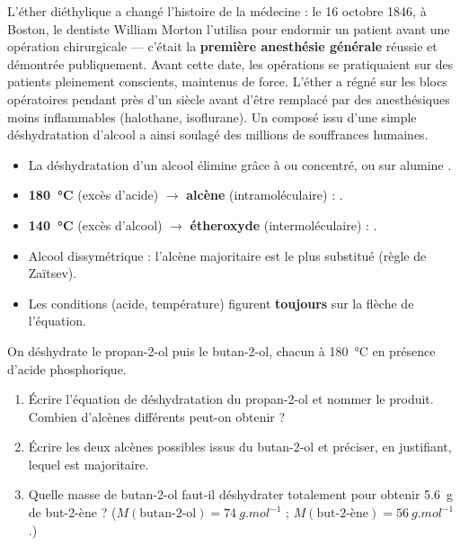 \documentclass[11pt]{article}
\newcommand{\cle}[1]{{\popxbold\color{popdark}#1}}
\begin{document}
\begin{savaistu}
L'éther diéthylique a changé l'histoire de la médecine : le 16 octobre 1846, à Boston, le dentiste William Morton l'utilisa pour endormir un patient avant une opération chirurgicale — c'était la \textbf{première anesthésie générale} réussie et démontrée publiquement. Avant cette date, les opérations se pratiquaient sur des patients pleinement conscients, maintenus de force. L'éther a régné sur les blocs opératoires pendant près d'un siècle avant d'être remplacé par des anesthésiques moins inflammables (halothane, isoflurane). Un composé issu d'une simple déshydratation d'alcool a ainsi soulagé des millions de souffrances humaines.
\end{savaistu}

\begin{aretenir}
\begin{itemize}
\item La déshydratation d'un alcool élimine  grâce à  ou  concentré, ou sur alumine .
\item \textbf{\SI{180}{\celsius}} (excès d'acide) $\to$ \textbf{alcène} (intramoléculaire) : .
\item \textbf{\SI{140}{\celsius}} (excès d'alcool) $\to$ \textbf{étheroxyde} (intermoléculaire) : .
\item Alcool dissymétrique : l'alcène majoritaire est le plus substitué (\cle{règle de Zaïtsev}).
\item Les conditions (acide, température) figurent \textbf{toujours} sur la flèche de l'équation.
\end{itemize}
\end{aretenir}

\begin{exercice}
On déshydrate le propan-2-ol  puis le butan-2-ol, chacun à \SI{180}{\celsius} en présence d'acide phosphorique.
\begin{enumerate}
\item Écrire l'équation de déshydratation du propan-2-ol et nommer le produit. Combien d'alcènes différents peut-on obtenir ?
\item Écrire les deux alcènes possibles issus du butan-2-ol et préciser, en justifiant, lequel est majoritaire.
\item Quelle masse de butan-2-ol faut-il déshydrater totalement pour obtenir \SI{5,6}{g} de but-2-ène ? ($M(\text{butan-2-ol}) = \SI{74}{g.mol^{-1}}$ ; $M(\text{but-2-ène}) = \SI{56}{g.mol^{-1}}$.)
\end{enumerate}
\end{exercice}
\end{document}
